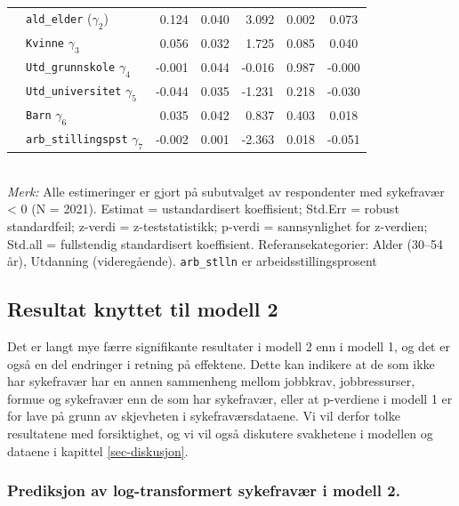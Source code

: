 \documentclass[
  12pt,
  a4paper,
  DIV=11,
  numbers=noendperiod]{scrartcl}
\begin{document}
\begin{table}[htbp]
\begin{tabular}{@{}llrrrrc@{}}
& \texttt{ald\_elder} ($\gamma_2$)        & 0.124 & 0.040 & 3.092  & 0.002  & 0.073 \\
& \texttt{Kvinne} $\gamma_3$            & 0.056 & 0.032 & 1.725  & 0.085  & 0.040 \\
& \texttt{Utd\_grunnskole} $\gamma_4$   & -0.001& 0.044 & -0.016 & 0.987  & -0.000 \\
& \texttt{Utd\_universitet} $\gamma_5$  & -0.044& 0.035 & -1.231 & 0.218  & -0.030 \\
& \texttt{Barn} $\gamma_6$              & 0.035 & 0.042 & 0.837  & 0.403  & 0.018 \\
& \texttt{arb\_stillingspst} $\gamma_7$ & -0.002& 0.001 & -2.363 & 0.018  & -0.051 \\
\bottomrule
\end{tabular}
\raggedright
\footnotesize{\\ 
\textit{Merk:} Alle estimeringer er gjort på subutvalget av respondenter med sykefravær < 0 (N = 2021). Estimat = ustandardisert koeffisient; Std.Err = robust standardfeil; z-verdi = z-teststatistikk; p-verdi = sannsynlighet for z-verdien; Std.all = fullstendig standardisert koeffisient. Referansekategorier: Alder (30–54 år), Utdanning (videregående). \texttt{arb\_stlln} er arbeidsstillingsprosent}
\end{table}

\clearpage

\subsection{Resultat knyttet til modell
2}\label{resultat-knyttet-til-modell-2-1}

Det er langt mye færre signifikante resultater i modell 2 enn i modell
1, og det er også en del endringer i retning på effektene. Dette kan
indikere at de som ikke har sykefravær har en annen sammenheng mellom
jobbkrav, jobbressurser, formue og sykefravær enn de som har sykefravær,
eller at p-verdiene i modell 1 er for lave på grunn av skjevheten i
sykefraværsdataene. Vi vil derfor tolke resultatene med forsiktighet, og
vi vil også diskutere svakhetene i modellen og dataene i kapittel
\ref{sec-diskusjon}.

\subsubsection{Prediksjon av log-transformert sykefravær i modell
2.}\label{prediksjon-av-log-transformert-sykefravuxe6r-i-modell-2.}
\end{document}
